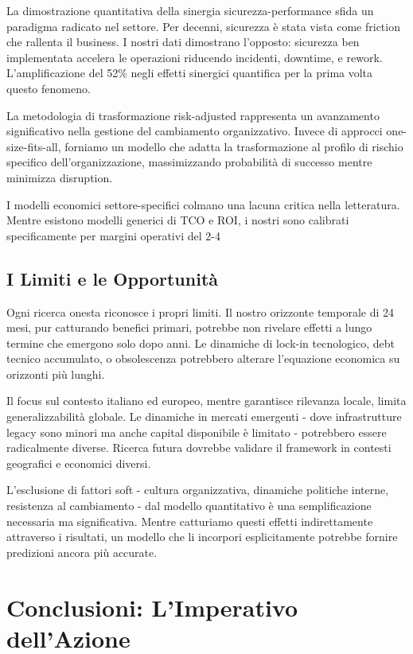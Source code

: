 La dimostrazione quantitativa della sinergia sicurezza-performance sfida un paradigma radicato nel settore. Per decenni, sicurezza è stata vista come friction che rallenta il business. I nostri dati dimostrano l'opposto: sicurezza ben implementata accelera le operazioni riducendo incidenti, downtime, e rework. L'amplificazione del 52\% negli effetti sinergici quantifica per la prima volta questo fenomeno.

La metodologia di trasformazione risk-adjusted rappresenta un avanzamento significativo nella gestione del cambiamento organizzativo. Invece di approcci one-size-fits-all, forniamo un modello che adatta la trasformazione al profilo di rischio specifico dell'organizzazione, massimizzando probabilità di successo mentre minimizza disruption.

I modelli economici settore-specifici colmano una lacuna critica nella letteratura. Mentre esistono modelli generici di TCO e ROI, i nostri sono calibrati specificamente per margini operativi del 2-4%

\subsection{I Limiti e le Opportunità}

Ogni ricerca onesta riconosce i propri limiti. Il nostro orizzonte temporale di 24 mesi, pur catturando benefici primari, potrebbe non rivelare effetti a lungo termine che emergono solo dopo anni. Le dinamiche di lock-in tecnologico, debt tecnico accumulato, o obsolescenza potrebbero alterare l'equazione economica su orizzonti più lunghi.

Il focus sul contesto italiano ed europeo, mentre garantisce rilevanza locale, limita generalizzabilità globale. Le dinamiche in mercati emergenti - dove infrastrutture legacy sono minori ma anche capital disponibile è limitato - potrebbero essere radicalmente diverse. Ricerca futura dovrebbe validare il framework in contesti geografici e economici diversi.

L'esclusione di fattori soft - cultura organizzativa, dinamiche politiche interne, resistenza al cambiamento - dal modello quantitativo è una semplificazione necessaria ma significativa. Mentre catturiamo questi effetti indirettamente attraverso i risultati, un modello che li incorpori esplicitamente potrebbe fornire predizioni ancora più accurate.

\section{Conclusioni: L'Imperativo dell'Azione}

